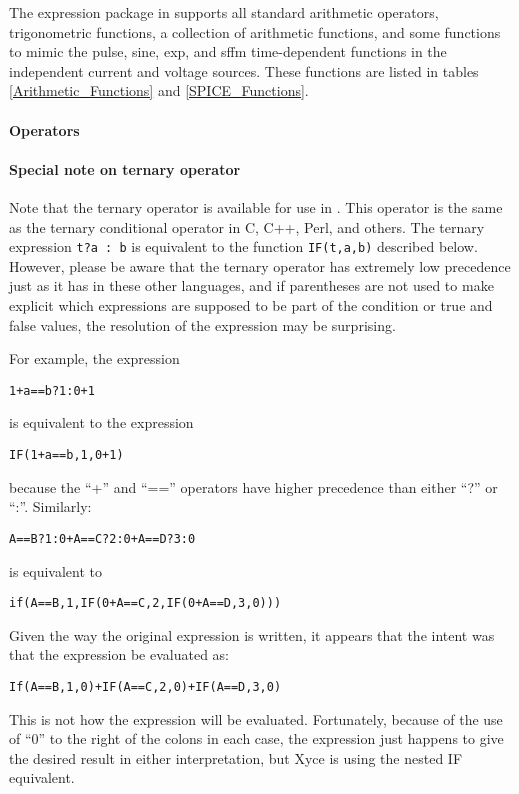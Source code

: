 The expression package in \Xyce{} supports all standard arithmetic
operators, trigonometric functions, a collection of arithmetic
functions, and some functions to mimic the pulse, sine, exp, and sffm
time-dependent functions in the independent current and voltage sources.
These functions are listed in tables \ref{Arithmetic_Functions} and
\ref{SPICE_Functions}.

\paragraph{Operators}


\paragraph{Special note on ternary operator}
Note that the ternary operator is available for use in \Xyce{}.  This
operator is the same as the ternary conditional operator in C, C++,
Perl, and others.  The ternary expression \texttt{t?a : b} is
equivalent to the function \texttt{IF(t,a,b)} described below.
However, please be aware that the ternary operator has extremely low
precedence just as it has in these other languages, and if parentheses
are not used to make explicit which expressions are supposed to be
part of the condition or true and false values, the resolution of the
expression may be surprising.

For example, the expression
\begin{alltt}
  1+a==b?1:0+1
\end{alltt}
is equivalent to the expression
\begin{alltt}
  IF(1+a==b,1,0+1)
\end{alltt}
because the ``+'' and ``=='' operators have higher precedence than
either ``?'' or ``:''.  Similarly:
\begin{alltt}
  A==B?1:0 + A==C?2:0 + A==D?3:0
\end{alltt}
is equivalent to
\begin{alltt}
  if(A==B,1,IF(0 + A==C,2,IF(0 + A==D,3,0)))
\end{alltt}
Given the way the original expression is written, it appears that the
intent was that the expression be evaluated as:
\begin{alltt}
  If(A==B,1,0) + IF(A==C,2,0) + IF(A==D,3,0)
\end{alltt}
This is not how the expression will be evaluated.  Fortunately,
because of the use of ``0'' to the right of the colons in each case,
the expression just happens to give the desired result in either
interpretation, but Xyce is using the nested IF equivalent.

